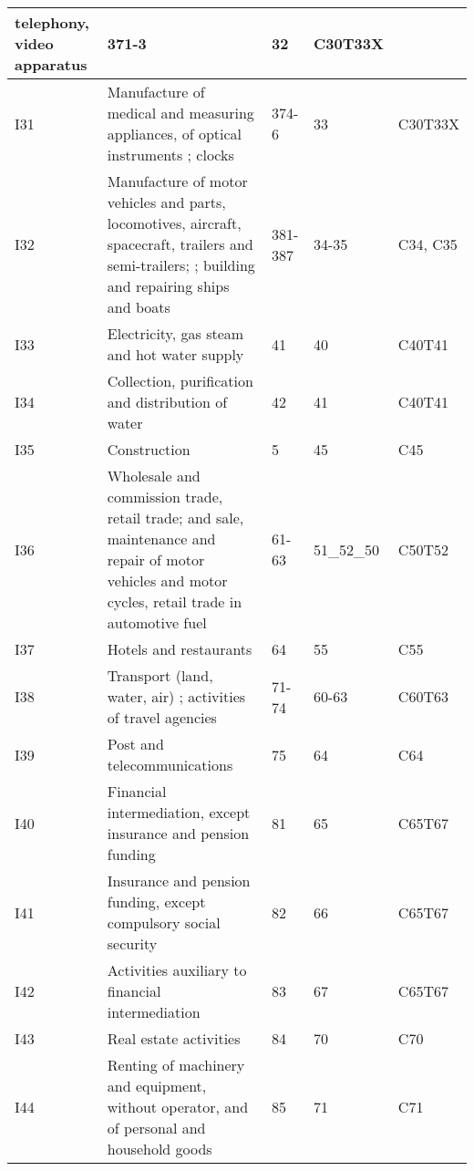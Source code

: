 \documentclass[12pt,english]{article}
\begin{document}
\begin{table}[ht]
\begin{adjustbox}{width=\textwidth}
\begin{tabular}{lp{500pt}lll}
		telephony, %
		video %
		apparatus %
		& 371-3 & 32 & C30T33X \\ \midrule
		I31 & Manufacture of medical and measuring appliances, %
		of optical instruments %
		; %
		clocks & 374-6 & 33 & C30T33X \\ \midrule
		I32 & Manufacture of motor vehicles and parts, %
		locomotives, aircraft, spacecraft, trailers and semi-trailers; %
		; building and repairing ships and boats%
		& 381-387 & 34-35 & C34, C35 \\ \midrule
		I33 & Electricity, gas steam and hot water supply & 41 & 40 & C40T41 \\ \midrule
		I34 & Collection, purification and distribution of water & 42 & 41 & C40T41 \\ \midrule
		I35 & Construction & 5 & 45 & C45 \\ \midrule
		I36 & Wholesale and commission trade, retail trade; and sale, maintenance and repair of motor vehicles and motor cycles, retail trade in automotive fuel & 61-63 & 51\_52\_50 & C50T52 \\ \midrule
		I37 & Hotels and restaurants & 64 & 55 & C55 \\ \midrule
		I38 & Transport (land, water, air) ; %
		activities of travel agencies & 71-74 & 60-63 & C60T63 \\ \midrule
		I39 & Post and telecommunications & 75 & 64 & C64 \\ \midrule
		I40 & Financial intermediation, except insurance and pension funding & 81 & 65 & C65T67 \\ \midrule
		I41 & Insurance and pension funding, except compulsory social security  & 82 & 66 & C65T67 \\ \midrule
		I42 & Activities auxiliary to financial intermediation & 83 & 67 & C65T67 \\ \midrule
		I43 & Real estate activities & 84 & 70 & C70 \\ \midrule
		I44 & Renting of machinery and equipment, without operator, and of personal and household goods & 85 & 71 & C71 \\ \midrule

\end{tabular}
\end{adjustbox}
\end{table}
\end{document}
